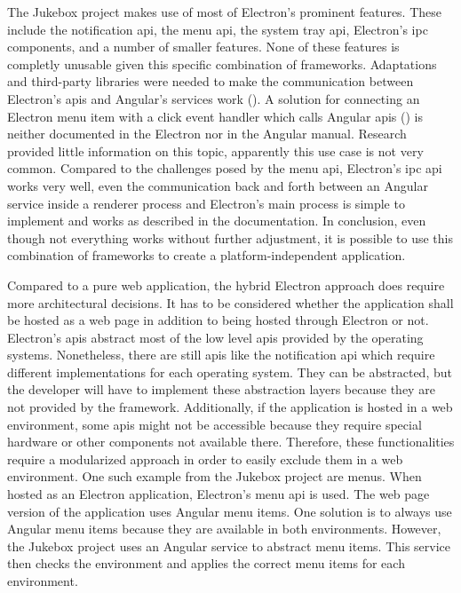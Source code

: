 


The Jukebox project makes use of most of Electron's prominent features. These include the notification \gls{api}, the menu \gls{api}, the system tray \gls{api}, Electron's \gls{ipc} components, and a number of smaller features. None of these features is completly unusable given this specific combination of frameworks. Adaptations and third-party libraries were needed to make the communication between Electron's \glspl{api} and Angular's services work (). A solution for connecting an Electron menu item with a click event handler which calls Angular \glspl{api} () is neither documented in the Electron nor in the Angular manual. Research provided little information on this topic, apparently this use case is not very common. Compared to the challenges posed by the menu \gls{api}, Electron's \gls{ipc} \gls{api} works very well, even the communication back and forth between an Angular service inside a renderer process and Electron's main process is simple to implement and works as described in the documentation. In conclusion, even though not everything works without further adjustment, it is possible to use this combination of frameworks to create a platform-independent application.


Compared to a pure web application, the hybrid Electron approach does require more architectural decisions. It has to be considered whether the application shall be hosted as a web page in addition to being hosted through Electron or not. Electron's \glspl{api} abstract most of the low level \glspl{api} provided by the operating systems. Nonetheless, there are still \glspl{api} like the notification \gls{api} which require different implementations for each operating system. They can be abstracted, but the developer will have to implement these abstraction layers because they are not provided by the framework. Additionally, if the application is hosted in a web environment, some \glspl{api} might not be accessible because they require special hardware or other components not available there. Therefore, these functionalities require a modularized approach in order to easily exclude them in a web environment. One such example from the Jukebox project are menus. When hosted as an Electron application, Electron's menu \gls{api} is used. The web page version of the application uses Angular menu items. One solution is to always use Angular menu items because they are available in both environments. However, the Jukebox project uses an Angular service to abstract menu items. This service then checks the environment and applies the correct menu items for each environment.


